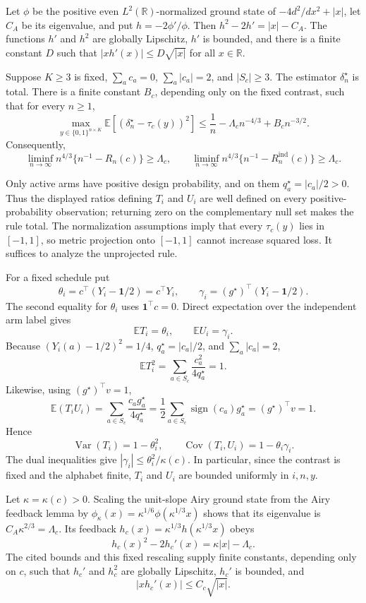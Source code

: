 Let \(\phi\) be the positive even \(L^2(\mathbb R)\)-normalized ground state of \(-4d^2/dx^2+|x|\), let \(C_A\) be its eigenvalue, and put \(h=-2\phi'/\phi\).  Then \(h^2-2h'=|x|-C_A\).  The functions \(h'\) and \(h^2\) are globally Lipschitz, \(h'\) is bounded, and there is a finite constant \(D\) such that \(|x h'(x)|\le D\sqrt{|x|}\) for all \(x\in\mathbb R\).

Suppose \(K\ge3\) is fixed, \(\sum_ac_a=0\), \(\sum_a|c_a|=2\), and \(|S_c|\ge3\).  The estimator \(\delta_n^\star\) is total.  There is a finite constant \(B_c\), depending only on the fixed contrast, such that for every \(n\ge1\),
\[
\max_{y\in\{0,1\}^{n\times K}}\mathbb E\!\left[(\delta_n^\star-\tau_c(y))^2\right]
\le \frac1n-\Lambda_cn^{-4/3}+B_cn^{-3/2}.
\]
Consequently,
\[
\liminf_{n\to\infty}n^{4/3}\{n^{-1}-R_n(c)\}\ge\Lambda_c,
\qquad
\liminf_{n\to\infty}n^{4/3}\{n^{-1}-R_n^{\mathrm{ind}}(c)\}\ge\Lambda_c.
\]

Only active arms have positive design probability, and on them \(q_a^\star=|c_a|/2>0\).  Thus the displayed ratios defining \(T_i\) and \(U_i\) are well defined on every positive-probability observation; returning zero on the complementary null set makes the rule total.  The normalization assumptions imply that every \(\tau_c(y)\) lies in \([-1,1]\), so metric projection onto \([-1,1]\) cannot increase squared loss.  It suffices to analyze the unprojected rule.

For a fixed schedule put
\[
\theta_i=c^\top(Y_i-\mathbf1/2)=c^\top Y_i,\qquad
\gamma_i=(g^\star)^\top(Y_i-\mathbf1/2).
\]
The second equality for \(\theta_i\) uses \(\mathbf1^\top c=0\).  Direct expectation over the independent arm label gives
\[
\mathbb ET_i=\theta_i,\qquad \mathbb EU_i=\gamma_i.
\]
Because \((Y_i(a)-1/2)^2=1/4\), \(q_a^\star=|c_a|/2\), and \(\sum_a|c_a|=2\),
\[
\mathbb ET_i^2=\sum_{a\in S_c}\frac{c_a^2}{4q_a^\star}=1.
\]
Likewise, using \((g^\star)^\top v=1\),
\[
\mathbb E(T_iU_i)=\sum_{a\in S_c}\frac{c_ag_a^\star}{4q_a^\star}
=\frac12\sum_{a\in S_c}\operatorname{sign}(c_a)g_a^\star
=(g^\star)^\top v=1.
\]
Hence
\[
\operatorname{Var}(T_i)=1-\theta_i^2,\qquad
\operatorname{Cov}(T_i,U_i)=1-\theta_i\gamma_i.
\]
The dual inequalities give \(|\gamma_i|\le\theta_i^2/\kappa(c)\).  In particular, since the contrast is fixed and the alphabet finite, \(T_i\) and \(U_i\) are bounded uniformly in \(i,n,y\).

Let \(\kappa=\kappa(c)>0\).  Scaling the unit-slope Airy ground state from the Airy feedback lemma by
\(\phi_\kappa(x)=\kappa^{1/6}\phi(\kappa^{1/3}x)\) shows that its eigenvalue is
\(C_A\kappa^{2/3}=\Lambda_c\).  Its feedback \(h_c(x)=\kappa^{1/3}h(\kappa^{1/3}x)\) obeys
\[
h_c(x)^2-2h_c'(x)=\kappa|x|-\Lambda_c.
\]
The cited bounds and this fixed rescaling supply finite constants, depending only on \(c\), such that \(h_c'\) and \(h_c^2\) are globally Lipschitz, \(h_c'\) is bounded, and
\[
|x h_c'(x)|\le C_c\sqrt{|x|}.
\]

